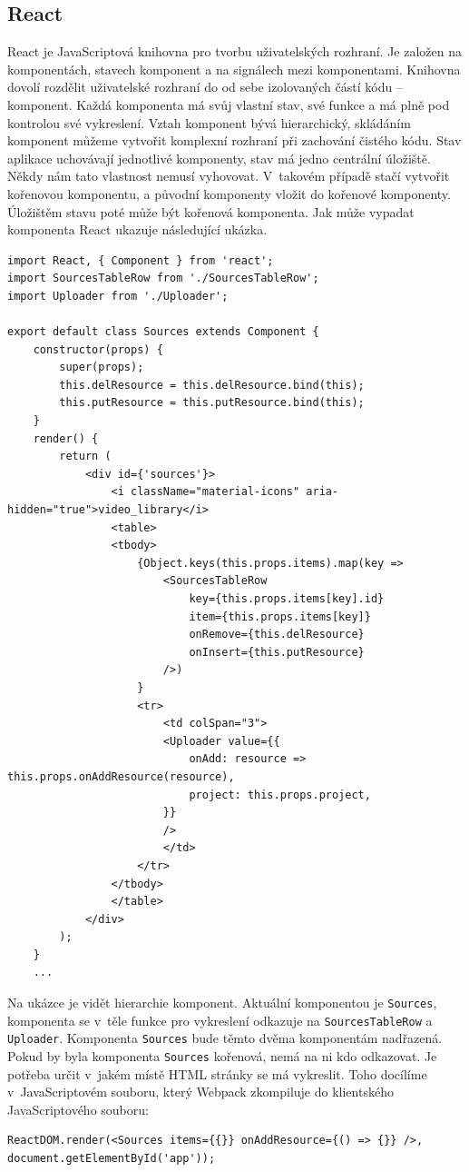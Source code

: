 \subsection{React}
React je JavaScriptová knihovna pro tvorbu uživatelských rozhraní. Je založen na komponentách, stavech komponent a na signálech mezi komponentami. Knihovna dovolí rozdělit uživatelské rozhraní do od sebe izolovaných částí kódu -- komponent. Každá komponenta má svůj vlastní stav, své funkce a má plně pod kontrolou své vykreslení. Vztah komponent bývá hierarchický, skládáním komponent můžeme vytvořit komplexní rozhraní při zachování čistého kódu. Stav aplikace uchovávají jednotlivé komponenty, stav má jedno centrální úložiště. Někdy nám tato vlastnost nemusí vyhovovat. V~takovém případě stačí vytvořit kořenovou komponentu, a původní komponenty vložit do kořenové komponenty. Úložištěm stavu poté může být kořenová komponenta. Jak může vypadat komponenta React ukazuje následující ukázka.
\begin{lstlisting}[style=JavaScript]
import React, { Component } from 'react';
import SourcesTableRow from './SourcesTableRow';
import Uploader from './Uploader';

export default class Sources extends Component {
    constructor(props) {
        super(props);
        this.delResource = this.delResource.bind(this);
        this.putResource = this.putResource.bind(this);
    }
    render() {
        return (
            <div id={'sources'}>
                <i className="material-icons" aria-hidden="true">video_library</i>
                <table>
                <tbody>
                    {Object.keys(this.props.items).map(key =>
                        <SourcesTableRow
                            key={this.props.items[key].id}
                            item={this.props.items[key]}
                            onRemove={this.delResource}
                            onInsert={this.putResource}
                        />)
                    }
                    <tr>
                        <td colSpan="3">
                        <Uploader value={{
                            onAdd: resource => this.props.onAddResource(resource),
                            project: this.props.project,
                        }}
                        />
                        </td>
                    </tr>
                </tbody>
                </table>
            </div>
        );
    }
    ...
\end{lstlisting}

Na ukázce je vidět hierarchie komponent. Aktuální komponentou je \texttt{Sources}, komponenta se v~těle funkce pro vykreslení odkazuje na \texttt{SourcesTableRow} a \texttt{Uploader}. Komponenta \texttt{Sources} bude těmto dvěma komponentám nadřazená. Pokud by byla komponenta \texttt{Sources} kořenová, nemá na ni kdo odkazovat. Je potřeba určit v~jakém místě HTML stránky se má vykreslit. Toho docílíme v~JavaScriptovém souboru, který Webpack zkompiluje do klientského JavaScriptového souboru:
\begin{lstlisting}[style=JavaScript]
ReactDOM.render(<Sources items={{}} onAddResource={() => {}} />, document.getElementById('app'));
\end{lstlisting}

